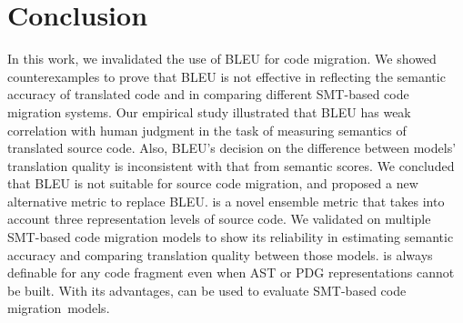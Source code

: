 \section{Conclusion}
In this work, we invalidated the use of BLEU for code migration. We
showed counterexamples to prove that BLEU is not effective in
reflecting the semantic accuracy of translated code and in comparing
different SMT-based code migration systems. Our empirical study
illustrated that BLEU has weak correlation with human judgment in the
task of measuring semantics of translated source code. Also, BLEU's
decision on the difference between models' translation quality is
inconsistent with that from semantic scores. We concluded that BLEU is
not suitable for source code migration, and proposed a new alternative
metric {\model} to replace BLEU. {\model} is a novel ensemble metric
that takes into account three representation levels of source code. We
validated {\model} on multiple SMT-based code migration models to show
its reliability in estimating semantic accuracy and comparing
translation quality between those models. {\model} is always definable
for any code fragment even when AST or PDG representations cannot be
built. With its advantages, {\model} can be used to evaluate
SMT-based code migration~models.

